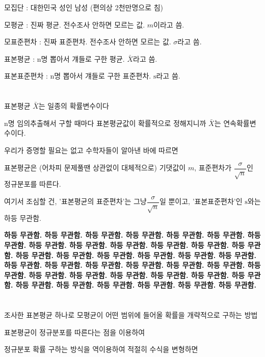 \documentclass{oblivoir}
\begin{document}
모집단 : 대한민국 성인 남성 (편의상 2천만명으로 침)\par
모평균 : 진짜 평균. 전수조사 안하면 모르는 값. $m$이라고 씀.\par
모표준편차 : 진짜 표준편차. 전수조사 안하면 모르는 값. $\sigma$라고 씀.\par
\par
표본평균 : n명 뽑아서 걔들로 구한 평균. $\bar{X}$라고 씀.\par
표본표준편차 : n명 뽑아서 걔들로 구한 표준편차. $\mathrm{s}$라고 씀.\par
\par\par

\section{}
표본평균  $\bar{X}$는 일종의 확률변수이다\par
n명 임의추출해서 구할 때마다 표본평균값이 확률적으로 정해지니까 $\bar{X}$는 연속확률변수이다.\par
우리가 증명할 필요는 없고 수학자들이 알아낸 바에 따르면\par
표본평균은 (어차피 문제풀땐 상관없이 대체적으로) 기댓값이 $m$, 표준편차가 $\dfrac{\sigma}{\sqrt{n}}$인 정규분포를 따른다.\par
여기서 조심할 건, '표본평균의 표준편차'는 그냥$\dfrac{\sigma}{\sqrt{n}}$일 뿐이고, '표본표준편차'인 $\mathrm{s}$와는 하등 무관함.\par
\begin{center}
    
\textbf{하등 무관함. 하등 무관함. 하등 무관함. 하등 무관함. 하등 무관함. 하등 무관함. 하등 무관함. 하등 무관함. 하등 무관함. 하등 무관함. 하등 무관함. 하등 무관함. 하등 무관함. 하등 무관함. 하등 무관함. 하등 무관함. 하등 무관함. 하등 무관함. 하등 무관함. 하등 무관함. 하등 무관함. 하등 무관함. 하등 무관함. 하등 무관함. 하등 무관함. 하등 무관함. 하등 무관함. 하등 무관함. 하등 무관함. 하등 무관함. 하등 무관함. 하등 무관함. 하등 무관함. 하등 무관함. 하등 무관함. 하등 무관함. 하등 무관함. 하등 무관함. }

\end{center}
\section{}
조사한 표본평균 하나로 모평균이 어떤 범위에 들어올 확률을 개략적으로 구하는 방법\par
표본평균이 정규분포를 따른다는 점을 이용하여\par
정규분포 확률 구하는 방식을 역이용하여 적절히 수식을 변형하면\par
\end{document}
